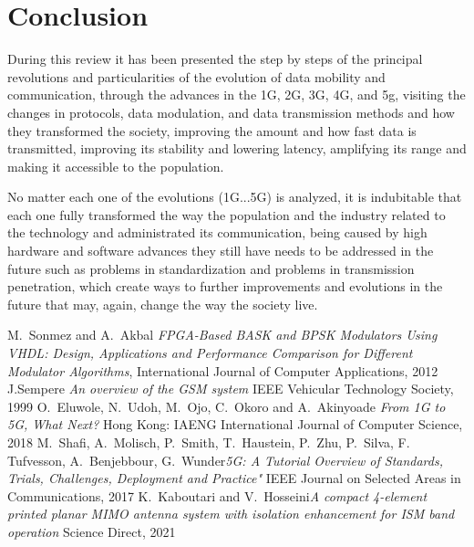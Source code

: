 \documentclass[10pt,journal,compsoc]{IEEEtran}
\begin{document}
\section{Conclusion}
During this review it has been presented the step by steps of the principal revolutions and particularities of the evolution of data mobility and communication, through the advances in the 1G, 2G, 3G, 4G, and 5g, visiting the changes in protocols, data modulation, and data transmission methods and how they transformed the society, improving the amount and how fast data is transmitted, improving its stability and lowering latency, amplifying its range and making it accessible to the population.
\par No matter each one of the evolutions (1G...5G) is analyzed, it is indubitable that each one fully transformed the way the population and the industry related to the technology and administrated its communication, being caused by high hardware and software advances they still have needs to be addressed in the future such as problems in standardization and problems in transmission penetration, which create ways to further improvements and evolutions in the future that may, again, change the way the society live.

\begin{thebibliography}{1}

\bibitem{}M.~Sonmez and A.~Akbal \emph{FPGA-Based BASK and BPSK Modulators Using VHDL:
Design, Applications and Performance Comparison for Different Modulator Algorithms}, International Journal of Computer Applications, 2012
\bibitem{}J.Sempere \emph{An overview of the GSM system} IEEE Vehicular Technology Society, 1999
\bibitem{}O.~Eluwole, N.~Udoh, M.~Ojo, C.~Okoro and A.~Akinyoade \emph{From 1G to 5G, What Next?} Hong Kong: IAENG International Journal of Computer Science, 2018
\bibitem{}M.~Shafi, A.~Molisch, P.~Smith, T.~Haustein, P.~Zhu, P.~Silva, F.~
Tufvesson, A.~Benjebbour, G.~Wunder\emph{5G: A Tutorial Overview of Standards, Trials, Challenges, Deployment and Practice"} IEEE Journal on Selected Areas in Communications, 2017
\bibitem{}K.~Kaboutari and V.~Hosseini\emph{A compact 4-element printed planar MIMO antenna system with isolation enhancement for ISM band operation} Science Direct, 2021

\end{thebibliography}
\end{document}
